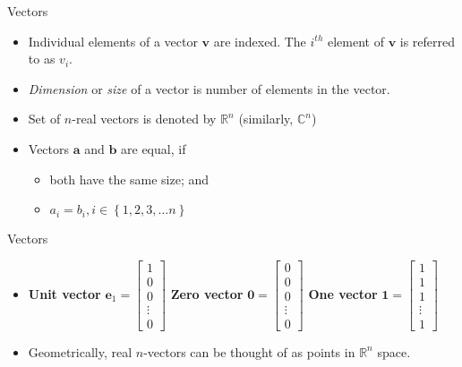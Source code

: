 \documentclass[aspectratio=169]{beamer}
\begin{document}
\begin{frame}[t]{Vectors}
  \begin{itemize}
    \item Individual elements of a vector $\mathbf{v}$ are indexed. The $i^{th}$ element of $\mathbf{v}$ is referred to as $v_i$.
    
    \item \textit{Dimension} or \textit{size} of a vector is number of elements in the vector.
    
    \item Set of $n$-real vectors is denoted by $\mathbb{R}^n$ (similarly, $\mathbb{C}^n$)
    
    \item Vectors $\mathbf{a}$ and $\mathbf{b}$ are equal, if
    \begin{itemize}
      \item both have the same size; and
      \item $a_i = b_i, i \in \left\{1, 2, 3, \ldots n\right\}$
    \end{itemize}
  \end{itemize}
\end{frame}


\begin{frame}[t]{Vectors}
  \begin{itemize}
    \item \textbf{Unit vector} $\mathbf{e}_1 = \begin{bmatrix} 1 \\ 0 \\ 0 \\ \vdots \\ 0 \end{bmatrix}$ \textbf{Zero vector} $\mathbf{0} = \begin{bmatrix} 0 \\ 0 \\ 0 \\ \vdots \\ 0 \end{bmatrix}$ \textbf{One vector} $\mathbf{1} = \begin{bmatrix} 1 \\ 1 \\ 1 \\ \vdots \\ 1 \end{bmatrix}$
    \item Geometrically, real $n$-vectors can be thought of as points in $\mathbb{R}^n$ space.\\
    \begin{center}
    \end{center}
  \end{itemize}
\end{frame}
\end{document}
